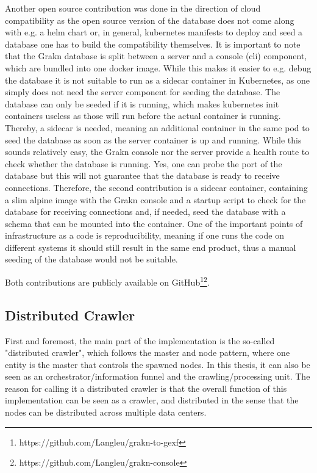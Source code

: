 Another open source contribution was done in the direction of cloud compatibility as the open source version of the database does not come along with e.g. a helm chart or, in general, kubernetes manifests to deploy and seed a database one has to build the compatibility themselves. It is important to note that the Grakn database is split between a server and a console (cli) component, which are bundled into one docker image. While this makes it easier to e.g. debug the database it is not suitable to run as a sidecar container in Kubernetes, as one simply does not need the server component for seeding the database. The database can only be seeded if it is running, which makes kubernetes init containers  useless as those will run before the actual container is running. Thereby, a sidecar is needed, meaning an additional container in the same pod to seed the database as soon as the server container is up and running. While this sounds relatively easy, the Grakn console nor the server provide a health route to check whether the database is running. Yes, one can probe the port of the database but this will not guarantee that the database is ready to receive connections. Therefore, the second contribution is a sidecar container, containing a slim alpine image with the Grakn console and a startup script to check for the database for receiving connections and, if needed, seed the database with a schema that can be mounted into the container.
One of the important points of infrastructure as a code is reproducibility, meaning if one runs the code on different systems it should still result in the same end product, thus a manual seeding of the database would not be suitable.

Both contributions are publicly available on GitHub\footnote{https://github.com/Langleu/grakn-to-gexf}\footnote{https://github.com/Langleu/grakn-console}.

\subsection{Distributed Crawler}
\label{sec:crawler}
First and foremost, the main part of the implementation is the so-called "distributed crawler", which follows the master and node pattern, where one entity is the master that controls the spawned nodes. In this thesis, it can also be seen as an orchestrator/information funnel and the crawling/processing unit. The reason for calling it a distributed crawler is that the overall function of this implementation can be seen as a crawler, and distributed in the sense that the nodes can be distributed across multiple data centers.

